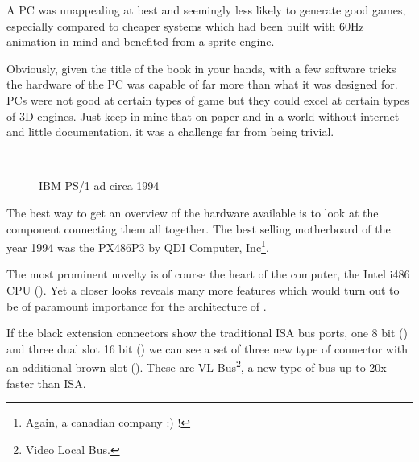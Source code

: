 \par
 A PC was unappealing at best and seemingly less likely to generate good games, especially compared to cheaper systems which had been built with 60Hz animation in mind and benefited from a sprite engine.\\
 \par
  Obviously, given the title of the book in your hands, with a few software tricks the hardware of the PC was capable of far more than what it was designed for. PCs were not good at certain types of game but they could excel at certain types of 3D engines. Just keep in mine that on paper and in a world without internet and little documentation, it was a challenge far from being trivial.\\
\par

\\
\par
\begin{figure}[H] \centering
{}
\caption{IBM PS/1 ad circa 1994}
\label{ibm_ps1_top}
\end{figure}


















\cleartoleftpage
 
The best way to get an overview of the hardware available is to look at the component connecting them all together. The best selling motherboard of the year 1994 was the PX486P3 by QDI Computer, Inc\footnote{Again, a canadian company :) !}.\\

\par
The most prominent novelty is of course the heart of the computer, the Intel i486 CPU (). Yet a closer looks reveals many more features which would turn out to be of paramount importance for the architecture of \doom.\\
\par 
If the black extension connectors show the traditional ISA bus ports, one 8 bit () and three dual slot 16 bit () we can see a set of three new type of connector with an additional brown slot (). These are VL-Bus\footnote{Video Local Bus.}, a new type of bus up to 20x faster than ISA.

